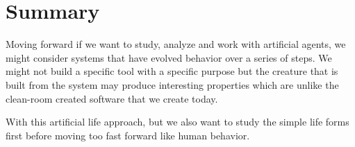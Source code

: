 \section{Summary}

Moving forward if we want to study, analyze and work with artificial agents, we
might consider systems that have evolved behavior over a series of steps.  We
might not build a specific tool with a specific purpose but the creature that is
built from the system may produce interesting properties which are unlike the
clean-room created software that we create today.

With this artificial life approach, but we also want to study the simple life
forms first before moving too fast forward like human behavior.
